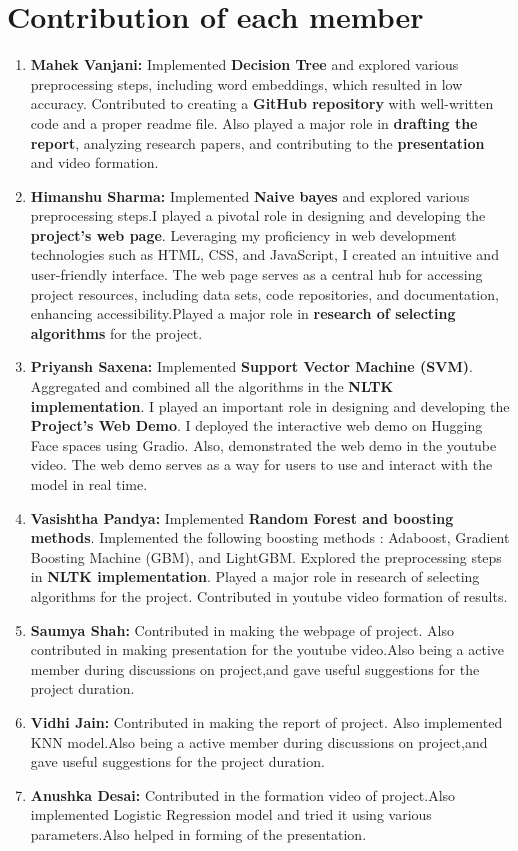 \documentclass[a4paper]{article}
\theoremstyle{plain}
\theoremstyle{definition}
\begin{document}
	\section{Contribution of each member}
	\label{sec:contribution}
	\begin{enumerate}
	\item \textbf{Mahek Vanjani:} Implemented \textbf{Decision Tree} and explored various preprocessing steps, including word embeddings, which resulted in low accuracy. Contributed to creating a \textbf{GitHub repository }with well-written code and a proper readme file. Also played a major role in \textbf{drafting the report}, analyzing research papers, and contributing to the \textbf{presentation} and video formation.
	\item \textbf{Himanshu Sharma:} Implemented \textbf{Naive bayes} and explored various preprocessing steps.I played a pivotal role in designing and developing the \textbf{project's web page}. Leveraging my proficiency in web development technologies such as HTML, CSS, and JavaScript, I created an intuitive and user-friendly interface. The web page serves as a central hub for accessing project resources, including data sets, code repositories, and documentation, enhancing accessibility.Played a major role in \textbf{research of selecting algorithms} for the project.
	\item \textbf{Priyansh Saxena:} Implemented \textbf{Support Vector Machine (SVM)}. Aggregated and combined all the algorithms in the \textbf{NLTK implementation}. I played an important role in designing and developing the \textbf{Project's Web Demo}. I deployed the interactive web demo on Hugging Face spaces using Gradio. Also, demonstrated the web demo in the youtube video. The web demo serves as a way for users to use and interact with the model in real time.
    \item \textbf{Vasishtha Pandya:} Implemented \textbf{ Random Forest and boosting methods}. Implemented the following boosting methods : Adaboost, Gradient Boosting Machine (GBM), and LightGBM. Explored the preprocessing steps in \textbf{NLTK implementation}. Played a major role in research of selecting algorithms for the project. Contributed in youtube video formation of results.
    \item \textbf{Saumya Shah:} Contributed in making the webpage of project. Also contributed in making presentation for the youtube video.Also being a active member during discussions on project,and gave useful suggestions for the project duration.
    \item \textbf{Vidhi Jain:} Contributed in making the report of project. Also implemented KNN model.Also being a active member during discussions on project,and gave useful suggestions for the project duration.
    \item \textbf{Anushka Desai:} Contributed in the formation  video of project.Also implemented Logistic Regression model and tried it using various parameters.Also helped in forming of the presentation.
    
    
    \end{enumerate}
 
\end{document}

